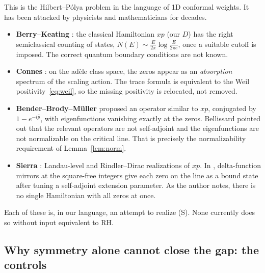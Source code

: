 \documentclass[11pt,a4paper]{article}
\theoremstyle{plain}
\theoremstyle{definition}
\theoremstyle{remark}
\begin{document}
This is the Hilbert--P\'olya problem in the language of 1D conformal
weights. It has been attacked by physicists and mathematicians for decades.
\begin{itemize}
\item \textbf{Berry--Keating} \cite{BerryKeating1999,BerryKeating1999b}:
the classical Hamiltonian $xp$ (our $D$) has the right semiclassical
counting of states, $N(E)\sim\frac{E}{2\pi}\log\frac{E}{2\pi e}$, once a
suitable cutoff is imposed. The correct quantum boundary conditions are not
known.
\item \textbf{Connes} \cite{Connes1999}: on the ad\`ele class space, the
zeros appear as an \emph{absorption} spectrum of the scaling action. The
trace formula is equivalent to the Weil positivity~\eqref{eq:weil}, so the
missing positivity is relocated, not removed.
\item \textbf{Bender--Brody--M\"uller} \cite{BBM2017} proposed an operator
similar to $xp$, conjugated by $1-e^{-i\hat p}$, with eigenfunctions
vanishing exactly at the zeros. Bellissard \cite{Bellissard2017} pointed out
that the relevant operators are not self-adjoint and the eigenfunctions are
not normalizable on the critical line. That is precisely the
normalizability requirement of Lemma~\ref{lem:norm}.
\item \textbf{Sierra} \cite{SierraTownsend2008,Sierra2019}: Landau-level and
Rindler--Dirac realizations of $xp$. In \cite{Sierra2019}, delta-function
mirrors at the square-free integers give each zero on the line as a bound
state after tuning a self-adjoint extension parameter. As the author notes,
there is no single Hamiltonian with all zeros at once.
\end{itemize}
Each of these is, in our language, an attempt to realize (S). None
currently does so without input equivalent to RH.

\subsection{Why symmetry alone cannot close the gap: the controls}
\end{document}
